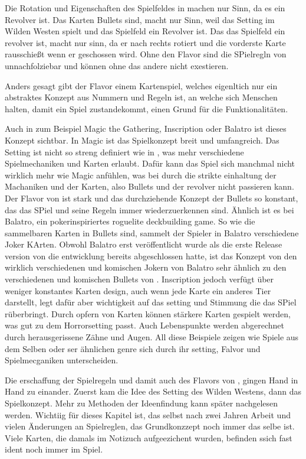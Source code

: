 Die Rotation und Eigenschaften des Spielfeldes in \FF machen nur Sinn, da es ein Revolver ist.
Das Karten Bullets sind, macht nur Sinn, weil das Setting im Wilden Westen spielt und das Spielfeld ein Revolver ist.
Das das Spielfeld ein revolver ist, macht nur sinn, da er nach rechts rotiert und die vorderste Karte rausschießt wenn er geschossen wird.
Ohne den Flavor sind die SPielregln von \FF unnachfolziebar und können ohne das andere nicht exestieren.


Anders gesagt gibt der Flavor einem Kartenspiel, welches eigenltich nur ein abstraktes Konzept aus Nummern und Regeln ist,
an welche sich Menschen halten, damit ein Spiel zustandekommt, einen Grund für die Funktionalitäten.


Auch in zum Beispiel Magic the Gathering, Inscription oder Balatro ist dieses Konzept sichtbar. In Magic ist das Spielkonzept breit und umfangreich.
Das Setting ist nicht so streng definiert wie in \FF, was mehr verschiedene Spielmechaniken und Karten erlaubt.
Dafür kann das Spiel sich manchmal nicht wirklich mehr wie Magic anfühlen,
was bei \FF durch die strikte einhaltung der Machaniken und der Karten, also  Bullets und der revolver nicht passieren kann.
Der Flavor von \FF ist stark und das durchziehende Konzept der Bullets so konstant, das das SPiel und seine Regeln immer
wiederzuerkennen sind. Ähnlich ist es bei Balatro, ein pokerinspiriertes roguelite deckbuilding game.
So wie die sammelbaren Karten in \FF Bullets sind, sammelt der Spieler in Balatro verschiedene Joker KArten.
Obwohl Balatro erst veröffentlicht wurde als die erste Release version von \FF die entwicklung bereits abgeschlossen hatte,
ist das Konzept von den wirklich verschiedenen und komischen Jokern von Balatro sehr ähnlich zu den verschiedenen und
komischen Bullets von \FF.
Inscription jedoch verfügt über weniger konstantes Karten design, auch wenn jede Karte ein anderes Tier darstellt,
legt dafür aber wichtigkeit auf das setting und Stimmung die das SPiel rüberbringt. Durch opfern von Karten können stärkere Karten
gespielt werden, was gut zu dem Horrorsetting passt. Auch Lebenspunkte werden abgerechnet durch herausgerissene Zähne und Augen.
All diese Beispiele zeigen wie Spiele aus dem Selben oder ser ähnlichen genre sich durch ihr setting, Falvor und Spielmecganiken unterscheiden.


Die erschaffung der Spielregeln und damit auch des Flavors von \FF, gingen Hand in Hand zu einander.
Zuerst kam die Idee des Setting des Wilden Westens, dann das Spielkonzept.
Mehr zu Methoden der Ideenfindung kann später nachgelesen werden. Wichtiig für dieses Kapitel ist,
das selbst nach zwei Jahren Arbeit und vielen Änderungen an Spielreglen, das Grundkonzzept noch immer das selbe ist.
Viele Karten, die damals im Notizuch aufgeezichent wurden, befinden ssich fast ident noch immer im Spiel.



